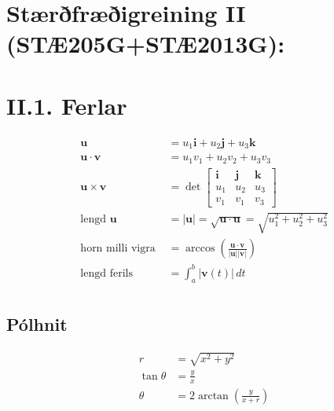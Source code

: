 \section*{Stærðfræðigreining II (STÆ205G+STÆ2013G):}
\section*{II.1. Ferlar}
\begin{align*}
	\mathbf u &= u_1\mathbf i + u_2 \mathbf j + u_3 \mathbf k\\
	\mathbf u \cdot \mathbf v &= u_1v_1 + u_2v_2 + u_3v_3\\
	\mathbf u\times \mathbf v &= \det \begin{bmatrix}
		\mathbf i & \mathbf j & \mathbf k\\
		u_1 & u_2 & u_3 \\
		v_1 & v_1 & v_3
	\end{bmatrix}\\
	\text{lengd } \mathbf u &= |\mathbf u| = 
	\sqrt{\mathbf u \cdot \mathbf u} = \sqrt{u_1^2+u_2^2+u_3^2}\\
	\text{horn milli vigra } &= \arccos \left( \frac{\mathbf u \cdot
	\mathbf v}{|\mathbf u||\mathbf v|}\right)\\
	\text{lengd ferils } &= \int_a^b |\mathbf v(t)|\, dt\\
\end{align*}

\subsection*{Pólhnit}
\begin{align*}
	r &= \sqrt{x^2+y^2}\\
	\tan \theta &= \frac yx\\
	\theta &= 2\arctan\left(\frac y{x+r}\right)\\
\end{align*}

